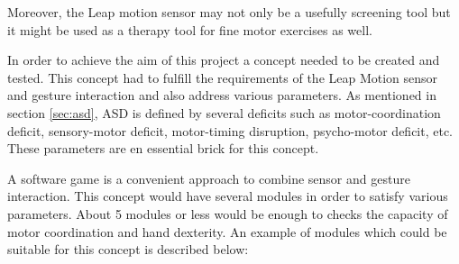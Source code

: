 Moreover, the Leap motion sensor may not only be a usefully screening tool but it might be used as a therapy tool for fine motor exercises as well.


In order to achieve the aim of this project a concept needed to be created and tested. This concept had to fulfill the requirements of the Leap Motion sensor and gesture interaction and also address various parameters. As mentioned in section \ref{sec:asd}, ASD is defined by several deficits such as motor-coordination deficit, sensory-motor deficit, motor-timing disruption, psycho-motor deficit, etc. These parameters are en essential brick for this concept.

A software game is a convenient approach to combine sensor and gesture interaction. This concept would have several modules in order to satisfy various parameters. About 5 modules or less would be enough to checks the capacity of motor coordination and hand dexterity. An example of modules which could be suitable for this concept is described below:  

